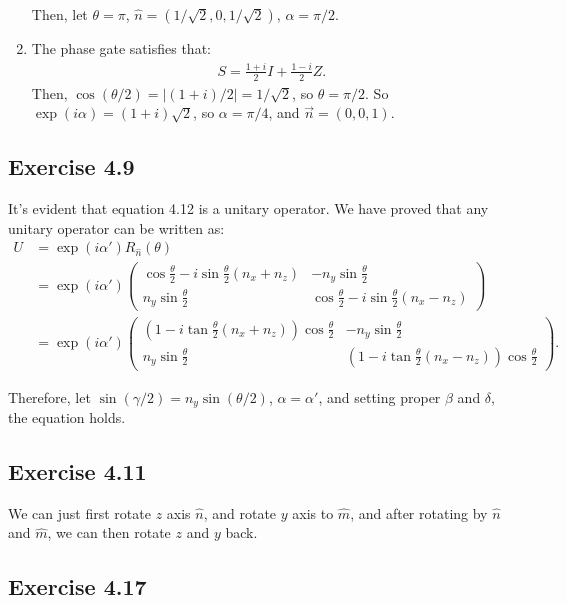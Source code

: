 \begin{enumerate}[1.]
    Then, let $\theta=\pi$, $\hat{n}=(1/\sqrt{2},0,1/\sqrt{2})$, $\alpha=\pi/2$.
    
    \item The phase gate satisfies that:
    \begin{align}
        S=\frac{1+i}{2}I+\frac{1-i}{2}Z.
    \end{align}
    Then, $\cos(\theta/2)=|(1+i)/2|=1/\sqrt{2}$, so $\theta=\pi/2$.
    So $\exp(i\alpha)=(1+i)\sqrt{2}$, so $\alpha = \pi/4$, and $\vec n =(0,0,1)$.
\end{enumerate}

\subsection*{Exercise 4.9}
It's evident that equation 4.12 is a unitary operator. 
We have proved that any unitary operator can be written as: 
\begin{align}
    U&=\exp(i\alpha')R_{\hat n}(\theta)\\
    &=\exp(i\alpha')\begin{pmatrix}
    \cos\frac{\theta}{2}-i\sin\frac{\theta}{2}(n_x+n_z) & -n_y\sin\frac{\theta}{2} \\ n_y\sin\frac{\theta}{2} & \cos\frac{\theta}{2}-i\sin\frac{\theta}{2}(n_x-n_z)
    \end{pmatrix}\\
    &=\exp(i\alpha')\begin{pmatrix}
    \left(1-i\tan\frac{\theta}{2}(n_x+n_z)\right)\cos\frac{\theta}{2} & -n_y\sin\frac{\theta}{2} \\ n_y\sin\frac{\theta}{2} & \left(1-i\tan\frac{\theta}{2}(n_x-n_z)\right)\cos\frac{\theta}{2}
    \end{pmatrix}
    .
\end{align}

    Therefore, let $\sin(\gamma/2)=n_y\sin(\theta/2)$, $\alpha=\alpha'$, and setting proper $\beta$ and $\delta$, the equation holds.
    
\subsection*{Exercise 4.11}

We can just first rotate $z$ axis $\hat n$, and rotate $y$ axis to $\hat m$, and after rotating by $\hat n$ and $\hat m$, we can then rotate $z$ and $y$ back.

\subsection*{Exercise 4.17}

